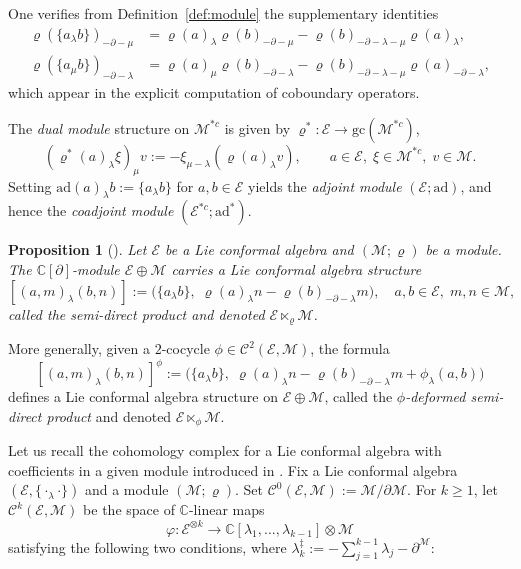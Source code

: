 \documentclass[a4paper,11pt]{article}
\def\Rg{\mathbb{C}[\partial]}
\def\Ep{\mathcal{E}}
\def\Mod{\mathcal{M}}
\def\rep{\varrho}
\def\Cch{\mathscr{C}}
\def\la{\lambda}
\def\p{\partial}
\def\C{\mathbb{C}}
\newcommand{\ad}{\mathrm{ad}}
\numberwithin{equation}{section}
\newtheorem{proposition}[theorem]{Proposition}
\begin{document}
One verifies from Definition~\ref{def:module} the supplementary
identities
\begin{align}
  \rep(\{a_\lambda b\})_{-\p-\mu}
  &= \rep(a)_\lambda\rep(b)_{-\p-\mu}
     - \rep(b)_{-\p-\la-\mu}\rep(a)_\lambda, \label{eq:mod-extra1}\\
  \rep(\{a_\mu b\})_{-\p-\la}
  &= \rep(a)_\mu\rep(b)_{-\p-\la}
     - \rep(b)_{-\p-\la-\mu}\rep(a)_{-\p-\la}, \label{eq:mod-extra2}
\end{align}
which appear in the explicit computation of coboundary operators.

The \textit{dual module} structure on $\Mod^{*c}$ is given by
$\rep^*:\Ep\to\mathrm{gc}(\Mod^{*c})$,
\[
  (\rep^*(a)_\lambda \xi)_\mu v
  := -\xi_{\mu-\lambda}(\rep(a)_\lambda v),
  \qquad a\in\Ep,\; \xi\in\Mod^{*c},\; v\in\Mod.
\]
Setting $\ad(a)_\lambda b := \{a_\lambda b\}$ for $a,b\in\Ep$ yields the
\textit{adjoint module} $(\Ep;\ad)$, and hence the
\textit{coadjoint module} $(\Ep^{*c};\ad^*)$.

\begin{proposition}[\cite{DK113}]
\label{prop:semidirect}
Let $\Ep$ be a Lie conformal  algebra and $(\Mod;\rep)$ be a module.  The
$\Rg$-module $\Ep\oplus\Mod$ carries a Lie conformal  algebra structure
\begin{equation}\label{eq:semidirect}
  [(a,m)_\lambda(b,n)]
  := \bigl(\{a_\lambda b\},\;
            \rep(a)_\lambda n - \rep(b)_{-\p-\lambda}m\bigr),
  \quad a,b\in\Ep,\; m,n\in\Mod,
\end{equation}
called the \textit{semi-direct product} and denoted $\Ep\ltimes_\rep\Mod$.
\end{proposition}

More generally, given a $2$-cocycle $\phi\in\Cch^2(\Ep,\Mod)$, the formula
\begin{equation}\label{eq:twisted-semidirect}
  [(a,m)_\lambda(b,n)]^\phi
  := \bigl(\{a_\lambda b\},\;
            \rep(a)_\lambda n - \rep(b)_{-\p-\lambda}m + \phi_\lambda(a,b)\bigr)
\end{equation}
defines a Lie conformal  algebra structure on $\Ep\oplus\Mod$, called the
\textit{$\phi$-deformed semi-direct product} and denoted
$\Ep\ltimes_\phi\Mod$.

Let us recall the cohomology complex for a Lie conformal algebra with coefficients in a given 
module introduced in \cite{DK113}. Fix a Lie conformal  algebra $(\Ep,\{\cdot_\lambda\cdot\})$ and a module
$(\Mod;\rep)$.  Set $\Cch^0(\Ep,\Mod) := \Mod/\partial\Mod$.  For
$k\geq 1$, let $\Cch^k(\Ep,\Mod)$ be the space of $\C$-linear maps
\[
  \varphi : \Ep^{\otimes k} \longrightarrow
  \C[\lambda_1,\ldots,\lambda_{k-1}]\otimes\Mod
\]
satisfying the following two conditions, where
$\lambda_k^\ddag := -\sum_{j=1}^{k-1}\lambda_j - \partial^\Mod$:
\end{document}
